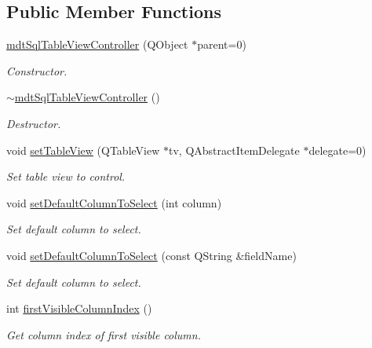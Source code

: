 \subsection*{Public Member Functions}
\begin{DoxyCompactItemize}
\item 
\hyperlink{classmdt_sql_table_view_controller_a45353c87eb09e39286b1223cbbe57264}{mdt\-Sql\-Table\-View\-Controller} (Q\-Object $\ast$parent=0)
\begin{DoxyCompactList}\small\item\em Constructor. \end{DoxyCompactList}\item 
\hyperlink{classmdt_sql_table_view_controller_ab27ae6453b6f2f393093b2391e1c0fdc}{$\sim$mdt\-Sql\-Table\-View\-Controller} ()
\begin{DoxyCompactList}\small\item\em Destructor. \end{DoxyCompactList}\item 
void \hyperlink{classmdt_sql_table_view_controller_a418030d1344a6f6928e444bad4413b41}{set\-Table\-View} (Q\-Table\-View $\ast$tv, Q\-Abstract\-Item\-Delegate $\ast$delegate=0)
\begin{DoxyCompactList}\small\item\em Set table view to control. \end{DoxyCompactList}\item 
void \hyperlink{classmdt_sql_table_view_controller_ab3c8ab8d57f4d8429de3197416c499a0}{set\-Default\-Column\-To\-Select} (int column)
\begin{DoxyCompactList}\small\item\em Set default column to select. \end{DoxyCompactList}\item 
void \hyperlink{classmdt_sql_table_view_controller_a97ac3160e2962953f4cb69826b77f242}{set\-Default\-Column\-To\-Select} (const Q\-String \&field\-Name)
\begin{DoxyCompactList}\small\item\em Set default column to select. \end{DoxyCompactList}\item 
int \hyperlink{classmdt_sql_table_view_controller_a62da5915a170ad19bb123d600732ee26}{first\-Visible\-Column\-Index} ()
\begin{DoxyCompactList}\small\item\em Get column index of first visible column. \end{DoxyCompactList}\item 

\end{DoxyCompactItemize}
